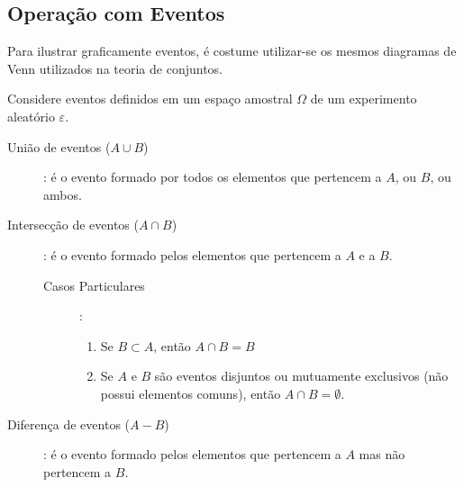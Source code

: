 \documentclass[11pt,a4paper]{book}
\begin{document}
\subsection{Operação com Eventos}
Para ilustrar graficamente eventos, é costume utilizar-se os mesmos diagramas de Venn utilizados na teoria de conjuntos.

Considere eventos definidos em um espaço amostral $\Omega$ de um experimento aleatório $\varepsilon$.

\begin{description}
  \item [União de eventos ($A \cup B$)]: é o evento formado por todos os elementos que pertencem a $A$, ou  $B$, ou ambos.
    \begin{figure}[H]
      \centering
      
      \caption{}
      \label{fig:1}
    \end{figure} 
  \item [Intersecção de eventos ($A \cap B$)]: é o evento formado pelos elementos que pertencem a $A$ e a $B$.
    \begin{figure}[H]
      \centering
      
      \caption{}
      \label{fig:2}
    \end{figure} 
    \begin{description}
      \item[Casos Particulares]:
        \begin{enumerate}
          \item Se $B \subset A$, então $A \cap B= B$ 

            \begin{figure}[H]
              \centering
              
              \caption{}
              \label{fig:3}
            \end{figure}

          \item Se $A$ e $B$ são eventos disjuntos ou mutuamente exclusivos (não possui elementos comuns), então $A\cap B = \emptyset$.

            \begin{figure}[H]
              \centering
              
              \caption{}
              \label{fig:4}
            \end{figure}

        \end{enumerate}
    \end{description}
  \item[Diferença de eventos ($A-B$)]: é o evento formado pelos elementos que pertencem a $A$ mas não pertencem a $B$.


\end{description}
\end{document}
